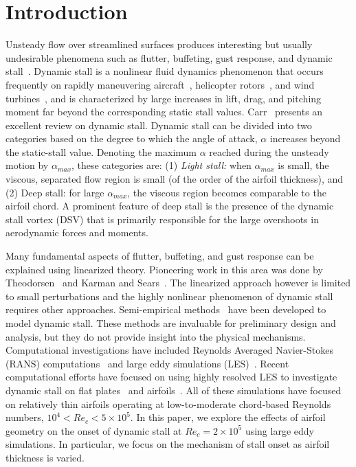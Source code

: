 \documentclass[aps,pra,preprint,groupedaddress]{revtex4-1}
\renewcommand{\=}[1]{\stackrel{#1}{=}} %
\begin{document}
\section{Introduction}
\label{sec:intro}

Unsteady flow over streamlined surfaces produces interesting but usually
undesirable phenomena such as flutter, buffeting, gust response, and dynamic
stall~\cite{McCroskey_1982}. Dynamic stall is a nonlinear fluid dynamics
phenomenon that occurs frequently on rapidly maneuvering
aircraft~\cite{brandon_1991}, helicopter rotors~\cite{ham_1968}, and wind
turbines~\cite{fujisawa_2001,larsen_2007}, and is characterized by large
increases in lift, drag, and pitching moment far beyond the corresponding
static stall values.  Carr~\cite{Carr_1988} presents an excellent review on
dynamic stall. Dynamic stall can be divided into two categories based on the
degree to which the angle of attack, $\alpha$ increases beyond the static-stall
value. Denoting the maximum $\alpha$ reached during the unsteady motion by
$\alpha_{max}$, these categories are: (1) {\em Light stall:} when
$\alpha_{max}$ is small, the viscous, separated flow region is small (of the
order of the airfoil thickness), and (2) Deep stall: for large $\alpha_{max}$,
the viscous region becomes comparable to the airfoil chord. A prominent feature
of deep stall is the presence of the dynamic stall vortex (DSV) that is
primarily responsible for the large overshoots in aerodynamic forces and
moments. 

Many fundamental aspects of flutter, buffeting, and gust response can be
explained using linearized theory. Pioneering work in this area was done by
Theodorsen~\cite{theodorsen_1935} and Karman and Sears~\cite{karman_1938}. The
linearized approach however is limited to small perturbations and the highly
nonlinear phenomenon of dynamic stall requires other approaches. Semi-empirical
methods~\cite{leishman_1989,ericsson_1988} have been developed to model dynamic
stall. These methods are invaluable for preliminary design and analysis, but
they do not provide insight into the physical mechanisms.  Computational
investigations have included Reynolds Averaged Navier-Stokes (RANS)
computations~\cite{visbal_1990} and large eddy simulations
(LES)~\cite{garmann_2011,visbal_2011}. Recent computational efforts have
focused on using highly resolved LES to investigate dynamic stall on flat
plates~\cite{garmann_2011} and airfoils~\cite{visbal_1990}. All of these
simulations have focused on relatively thin airfoils operating at
low-to-moderate chord-based Reynolds numbers, $10^4 < Re_c < 5\times10^5$. In
this paper, we explore the effects of airfoil geometry on the onset of dynamic
stall at $Re_c=2\times 10^5$ using large eddy simulations. In particular, we
focus on the mechanism of stall onset as airfoil thickness is varied.
\end{document}
